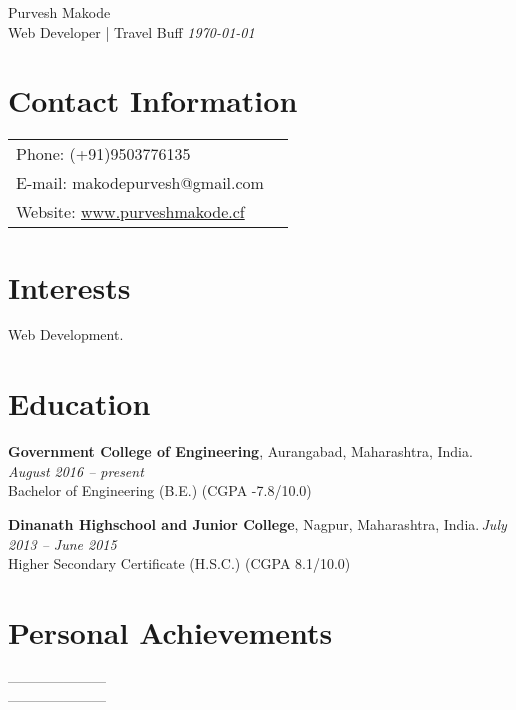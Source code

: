 \documentclass[margin,line]{res}
\begin{document}
{\Huge \ttfamily Purvesh Makode} \\
{\small Web Developer | Travel Buff} \hspace{11cm} {\em \today}
\vspace{0.03in}
\begin{resume}
\section{\sc Contact Information}



\vspace{.08in}

\begin{tabular} {@{}p{3in}p{1in}}
             {Phone:}  (+91)9503776135 \\
		{E-mail:}  makodepurvesh@gmail.com\\
		 {Website:} \url{www.purveshmakode.cf}
\end{tabular}


\section{\sc Interests}

Web Development.

\section{\sc Education}
{\bf Government College of Engineering}, Aurangabad, Maharashtra, India.\, \hfill  {\em August 2016 -- present} \\
Bachelor of Engineering (B.E.) \hfill(CGPA -7.8/10.0)

{\bf Dinanath Highschool and Junior College}, Nagpur, Maharashtra, India.\,\hfill {\em July 2013 -- June 2015}\\
Higher Secondary Certificate (H.S.C.) \hfill(CGPA 8.1/10.0)
 
\iffalse
\section{\sc Awards and Fellowships}
Award 1\\
Fellowship 1\\
\fi

\section{\sc Personal Achievements}
---------------------\\
---------------------

\end{resume}
\end{document}
